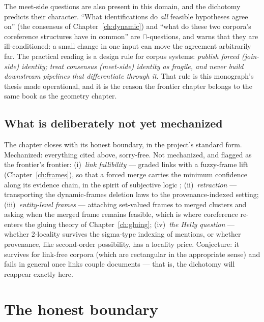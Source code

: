 \documentclass[10pt,twocolumn]{report}
\newcommand{\code}[1]{\texttt{\seqsplit{#1}}}
\renewcommand{\[}{\par\smallskip\noindent\begin{adjustbox}{max width=\columnwidth}$\displaystyle}%
\renewcommand{\]}{$\end{adjustbox}\par\smallskip}%
\theoremstyle{definition}
\theoremstyle{remark}
\begin{document}
The meet-side questions are also present in this domain, and the
dichotomy predicts their character.  ``What identifications do
\emph{all} feasible hypotheses agree on'' (the \code{mustSetoid}
consensus of Chapter~\ref{ch:dynamic}) and ``what do these two
corpora's coreference structures have in common'' are
$\sqcap$-questions, and \code{shannonDist\_inf\_not\_contraction} warns
that they are ill-conditioned: a small change in one input can move the
agreement arbitrarily far.  The practical reading is a design rule for
corpus systems: \emph{publish forced (join-side) identity; treat
consensus (meet-side) identity as fragile, and never build downstream
pipelines that differentiate through it}.  That rule is this
monograph's thesis made operational, and it is the reason the frontier
chapter belongs to the same book as the geometry chapter.

\section{What is deliberately not yet mechanized}
\label{sec:coref-open}

The chapter closes with its honest boundary, in the project's standard
form.  Mechanized: everything cited above, sorry-free.  Not mechanized,
and flagged as the frontier's frontier:
(i)~\emph{link fallibility} --- graded links with a fuzzy-frame lift
(Chapter~\ref{ch:frames}), so that a forced merge carries the minimum
confidence along its evidence chain, in the spirit of subjective logic
\citep{josang2016subjectiveLogic};
(ii)~\emph{retraction} --- transporting the dynamic-frames deletion
laws to the provenance-indexed setting;
(iii)~\emph{entity-level frames} --- attaching set-valued frames to
merged clusters and asking when the merged frame remains feasible,
which is where coreference re-enters the gluing theory of
Chapter~\ref{ch:gluing};
(iv)~\emph{the Helly question} --- whether 2-locality survives the
sigma-type indexing of mentions, or whether provenance, like
second-order possibility, has a locality price.  Conjecture: it
survives for link-free corpora (which are rectangular in the
appropriate sense) and fails in general once links couple documents ---
that is, the dichotomy will reappear exactly here.

\chapter{The honest boundary}
\label{ch:boundary}
\end{document}
